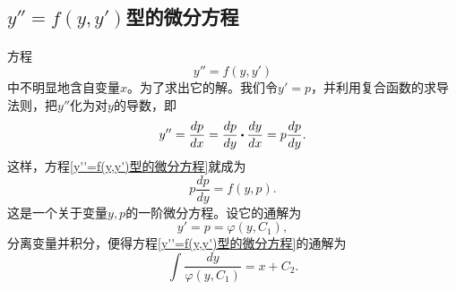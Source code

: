 \subsection{$y''=f(y,y')$型的微分方程}
\paragraph{}
方程
\begin{equation}
  \label{y''=f(y,y')型的微分方程}
  y'' = f(y,y')
\end{equation}
中不明显地含自变量$x$。为了求出它的解。我们令$y'=p$，并利用复合函数的求导法则，把$y''$化为对$y$的导数，即
\begin{equation*}
  y'' = \frac{dp}{dx} = \frac{dp}{dy} \bigcdot \frac{dy}{dx} = p\frac{dp}{dy}.
\end{equation*}
这样，方程\eqref{y''=f(y,y')型的微分方程}就成为
\begin{equation*}
  p\frac{dp}{dy} = f(y,p).
\end{equation*}
这是一个关于变量$y, p$的一阶微分方程。设它的通解为
\begin{equation*}
  y' = p = \varphi(y,C_1),
\end{equation*}
分离变量并积分，便得方程\eqref{y''=f(y,y')型的微分方程}的通解为
\begin{equation*}
  \int\frac{dy}{\varphi(y,C_1)} = x + C_2.
\end{equation*}
